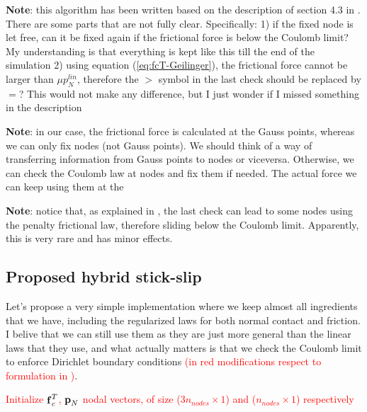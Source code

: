 \documentclass[3p]{elsarticle}
\begin{document}
\noindent \textbf{Note}: this algorithm has been written based on the description of  section 4.3 in \cite{Geilinger2020}. There are some parts that are not fully clear. Specifically: 1) if the fixed node is let free, can it be fixed again if the frictional force is below the Coulomb limit? My understanding is that everything is kept like this till the end of the simulation 2) using equation (\ref{eq:fcT-Geilinger}), the frictional force cannot be larger than $\mu p_N^{lin}$, therefore the $>$ symbol in the last check should be replaced by $=$? This would not make any difference, but I just wonder if I missed something in the description
\noindent 

\noindent \textbf{Note}: in our case, the frictional force is calculated at the Gauss points, whereas we can only fix nodes (not Gauss points). We should think of a way of transferring information from Gauss points to nodes or viceversa. Otherwise, we can check the Coulomb law at nodes and fix them if needed. The actual force we can keep using them at the 

\noindent \textbf{Note}: notice that, as explained in \cite{Geilinger2020}, the last check can lead to some nodes using the penalty frictional law, therefore sliding below the Coulomb limit. Apparently, this is very rare and has minor effects.
\newpage

\subsection{Proposed hybrid stick-slip}
Let's propose a very simple implementation where we keep almost all ingredients that we have, including the regularized laws for both normal contact and friction. I belive that we can still use them as they are just more general than the linear laws that they use, and what actually matters is that we check the Coulomb limit to enforce Dirichlet boundary conditions \textcolor{red}{(in red modifications respect to formulation in \cite{Geilinger2020})}. 

\vspace{5 mm}
\textcolor{red}{Initialize $\text{\textbf{f}}_c^T$, $\text{\textbf{p}}_N$ nodal vectors, of size ($3n_{nodes} \times 1$) and ($n_{nodes} \times 1$) respectively}
\end{document}
